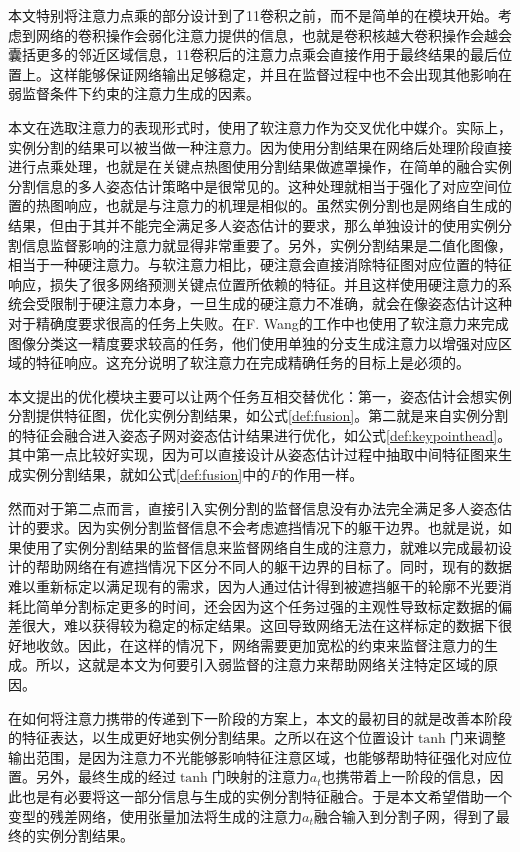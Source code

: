 本文特别将注意力点乘的部分设计到了1\times1卷积之前，而不是简单的在模块开始。考虑到网络的卷积操作会弱化注意力提供的信息，也就是卷积核越大卷积操作会越会囊括更多的邻近区域信息，1\times1卷积后的注意力点乘会直接作用于最终结果的最后位置上。这样能够保证网络输出足够稳定，并且在监督过程中也不会出现其他影响在弱监督条件下约束的注意力生成的因素。

本文在选取注意力的表现形式时，使用了软注意力作为交叉优化中媒介。实际上，实例分割的结果可以被当做一种注意力。因为使用分割结果在网络后处理阶段直接进行点乘处理，也就是在关键点热图使用分割结果做遮罩操作，在简单的融合实例分割信息的多人姿态估计策略中是很常见的。这种处理就相当于强化了对应空间位置的热图响应，也就是与注意力的机理是相似的。虽然实例分割也是网络自生成的结果，但由于其并不能完全满足多人姿态估计的要求，那么单独设计的使用实例分割信息监督影响的注意力就显得非常重要了。另外，实例分割结果是二值化图像，相当于一种硬注意力。与软注意力相比，硬注意会直接消除特征图对应位置的特征响应，损失了很多网络预测关键点位置所依赖的特征。并且这样使用硬注意力的系统会受限制于硬注意力本身，一旦生成的硬注意力不准确，就会在像姿态估计这种对于精确度要求很高的任务上失败。在F. Wang的工作\cite{wang2017residual}中也使用了软注意力来完成图像分类这一精度要求较高的任务，他们使用单独的分支生成注意力以增强对应区域的特征响应。这充分说明了软注意力在完成精确任务的目标上是必须的。

本文提出的优化模块主要可以让两个任务互相交替优化：第一，姿态估计会想实例分割提供特征图，优化实例分割结果，如公式\eqref{def:fusion}。第二就是来自实例分割的特征会融合进入姿态子网对姿态估计结果进行优化，如公式\eqref{def:keypointhead}。其中第一点比较好实现，因为可以直接设计从姿态估计过程中抽取中间特征图来生成实例分割结果，就如公式\eqref{def:fusion}中的$F$的作用一样。

然而对于第二点而言，直接引入实例分割的监督信息没有办法完全满足多人姿态估计的要求。因为实例分割监督信息不会考虑遮挡情况下的躯干边界。也就是说，如果使用了实例分割结果的监督信息来监督网络自生成的注意力，就难以完成最初设计的帮助网络在有遮挡情况下区分不同人的躯干边界的目标了。同时，现有的数据难以重新标定以满足现有的需求，因为人通过估计得到被遮挡躯干的轮廓不光要消耗比简单分割标定更多的时间，还会因为这个任务过强的主观性导致标定数据的偏差很大，难以获得较为稳定的标定结果。这回导致网络无法在这样标定的数据下很好地收敛。因此，在这样的情况下，网络需要更加宽松的约束来监督注意力的生成。所以，这就是本文为何要引入弱监督的注意力来帮助网络关注特定区域的原因。

在如何将注意力携带的传递到下一阶段的方案上，本文的最初目的就是改善本阶段的特征表达，以生成更好地实例分割结果。之所以在这个位置设计$\tanh$门来调整输出范围，是因为注意力不光能够影响特征注意区域，也能够帮助特征强化对应位置。另外，最终生成的经过$\tanh$门映射的注意力$a_t$也携带着上一阶段的信息，因此也是有必要将这一部分信息与生成的实例分割特征融合。于是本文希望借助一个变型的残差网络，使用张量加法将生成的注意力$a_t$融合输入到分割子网，得到了最终的实例分割结果。


